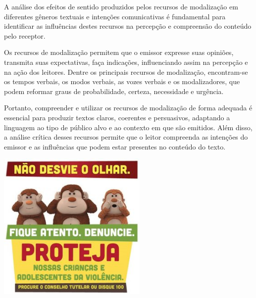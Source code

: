 {{\begin{escolha}
{A análise dos efeitos de sentido produzidos pelos recursos de
modalização em diferentes gêneros textuais e intenções comunicativas é
fundamental para identificar as influências destes recursos na percepção
e compreensão do conteúdo pelo receptor.

Os recursos de modalização permitem que o emissor expresse suas
opiniões, transmita suas expectativas, faça indicações, influenciando
assim na percepção e na ação dos leitores. Dentre os principais recursos
de modalização, encontram-se os tempos verbais, os modos verbais, as
vozes verbais e os modalizadores, que podem reformar graus de
probabilidade, certeza, necessidade e urgência.

Portanto, compreender e utilizar os recursos de modalização de forma
adequada é essencial para produzir textos claros, coerentes e
persuasivos, adaptando a linguagem ao tipo de público alvo e ao contexto
em que são emitidos. Além disso, a análise crítica desses recursos
permite que o leitor compreenda as intenções do emissor e as influências
que podem estar presentes no conteúdo do texto.}



\includegraphics[width=2.85536in,height=2.85536in]{./imgSAEB_7_POR/media/image9.png}


\end{escolha}}}
